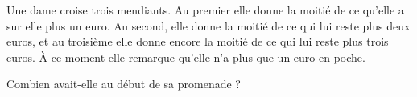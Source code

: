 
\begin{exercice}\label{exosmath-0228}

Une dame croise trois mendiants. Au premier elle donne la moitié de ce qu'elle a sur elle plus un euro. Au second, elle donne la moitié de ce qui lui reste plus deux euros, et au troisième elle donne encore la moitié de ce qui lui reste plus trois euros. À ce moment elle remarque qu'elle n'a plus que un euro en poche.

Combien avait-elle au début de sa promenade ?

\end{exercice}
